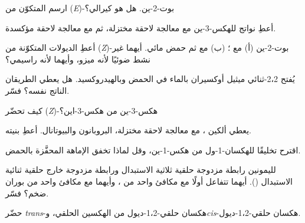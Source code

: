 \begin{exercise}[$\star$]\label{exo:b2:alkene-redox:3}
ارسم  المتكوّن من (\textit{E})-بوت-2-ين. هل هو كيرالي؟
\end{exercise}

\begin{exercise}[$\star$]\label{exo:b2:alkene-redox:4}
أعطِ نواتج  للهكس-3-ين مع معالجة لاحقة مختزلة، ثم مع معالجة
لاحقة مؤكسدة.
\end{exercise}

\begin{exercise}[$\star\star$]\label{exo:b2:alkene-redox:5}
أعطِ الديولات المتكوّنة من (\textit{Z})-بوت-2-ين (أ) مع ؛ (ب) مع 
ثم حمض مائي. أيهما غير نشط ضوئيًا لأنه ميزو، وأيهما لأنه
راسيمي؟
\end{exercise}

\begin{exercise}[$\star\star$]\label{exo:b2:alkene-redox:6}
يُفتح 2،2-ثنائي ميثيل أوكسيران بالماء في الحمض وبالهيدروكسيد. هل يعطي الطريقان
الناتج نفسه؟ فسّر.
\end{exercise}

\begin{exercise}[$\star\star$]\label{exo:b2:alkene-redox:7}
كيف تحضّر (\textit{Z})-هكس-3-ين من هكس-3-اين؟
\end{exercise}

\begin{exercise}[$\star\star$]\label{exo:b2:alkene-redox:8}
يعطي ألكين ،  مع معالجة لاحقة مختزلة، البروبانون والبيوتانال.
أعطِ بنيته.
\end{exercise}

\begin{exercise}[$\star\star$]\label{exo:b2:alkene-redox:9}
اقترح تخليقًا للهكسان-1-ول من هكس-1-ين، وقل لماذا تخفق الإماهة المحفَّزة
بالحمض.
\end{exercise}

\begin{exercise}[$\star\star\star$]\label{exo:b2:alkene-redox:10}
لليمونين رابطة مزدوجة حلقية ثلاثية الاستبدال ورابطة مزدوجة خارج حلقية ثنائية الاستبدال
(). أيهما تتفاعل أولًا مع مكافئ واحد من ، وأيهما مع
مكافئ واحد من بوران ضخم؟ فسّر.
\end{exercise}

\begin{exercise}[$\star\star\star$]\label{exo:b2:alkene-redox:11}
حضّر \textit{trans}-هكسان حلقي-1،2-ديول من الهكسين الحلقي، و\textit{cis}-هكسان حلقي-1،2-ديول.
\end{exercise}

